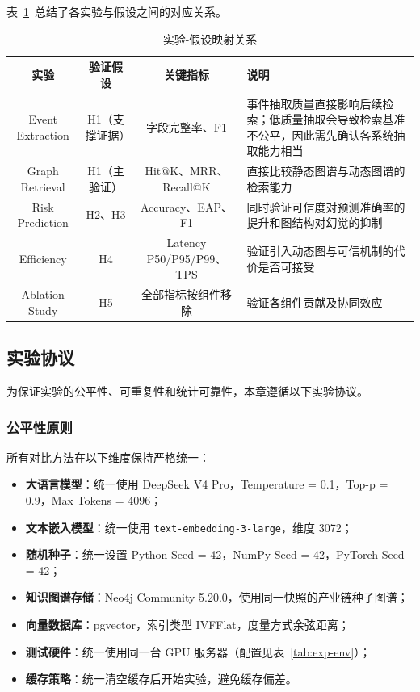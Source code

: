 \documentclass[12pt,a4paper]{article}
\newcommand{\term}[1]{\textbf{#1}}
\begin{document}
表~\ref{tab:hypothesis-mapping}~总结了各实验与假设之间的对应关系。

\begin{table}[H]
\centering
\footnotesize
\caption{实验-假设映射关系}
\label{tab:hypothesis-mapping}
\begin{tabularx}{0.95\linewidth}{c c c X}
\toprule
\textbf{实验} & \textbf{验证假设} & \textbf{关键指标} & \textbf{说明} \\
\midrule
Event Extraction & H1（支撑证据） & 字段完整率、F1 & 事件抽取质量直接影响后续检索；低质量抽取会导致检索基准不公平，因此需先确认各系统抽取能力相当 \\
Graph Retrieval & H1（主验证） & Hit@K、MRR、Recall@K & 直接比较静态图谱与动态图谱的检索能力 \\
Risk Prediction & H2、H3 & Accuracy、EAP、F1 & 同时验证可信度对预测准确率的提升和图结构对幻觉的抑制 \\
Efficiency & H4 & Latency P50/P95/P99、TPS & 验证引入动态图与可信机制的代价是否可接受 \\
Ablation Study & H5 & 全部指标按组件移除 & 验证各组件贡献及协同效应 \\
\bottomrule
\end{tabularx}
\end{table}

\subsection{实验协议}
\label{sec:exp-protocol}

为保证实验的公平性、可重复性和统计可靠性，本章遵循以下实验协议。

\subsubsection{公平性原则}

所有对比方法在以下维度保持严格统一：
\begin{itemize}
    \item \term{大语言模型}：统一使用 DeepSeek V4 Pro，Temperature = 0.1，Top-p = 0.9，Max Tokens = 4096；
    \item \term{文本嵌入模型}：统一使用 \texttt{text-embedding-3-large}，维度 3072；
    \item \term{随机种子}：统一设置 Python Seed = 42，NumPy Seed = 42，PyTorch Seed = 42；
    \item \term{知识图谱存储}：Neo4j Community 5.20.0，使用同一快照的产业链种子图谱；
    \item \term{向量数据库}：pgvector，索引类型 IVFFlat，度量方式余弦距离；
    \item \term{测试硬件}：统一使用同一台 GPU 服务器（配置见表~\ref{tab:exp-env}）；
    \item \term{缓存策略}：统一清空缓存后开始实验，避免缓存偏差。
\end{itemize}
\end{document}
